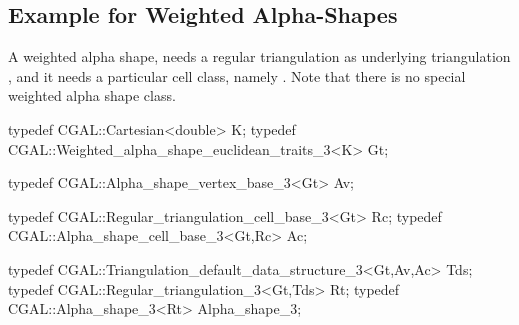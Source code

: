 
\subsection{Example for Weighted Alpha-Shapes\label{I1_SectWeightedAS3D}}

A weighted alpha shape, needs a regular triangulation as
underlying triangulation , and it needs a particular
cell class, namely .
Note that there is no special weighted alpha shape class.

\begin{cprog}
typedef CGAL::Cartesian<double> K;
typedef CGAL::Weighted_alpha_shape_euclidean_traits_3<K> Gt;

typedef CGAL::Alpha_shape_vertex_base_3<Gt> Av;

typedef CGAL::Regular_triangulation_cell_base_3<Gt> Rc;
typedef CGAL::Alpha_shape_cell_base_3<Gt,Rc>  Ac;

typedef CGAL::Triangulation_default_data_structure_3<Gt,Av,Ac> Tds;
typedef CGAL::Regular_triangulation_3<Gt,Tds> Rt;
typedef CGAL::Alpha_shape_3<Rt> Alpha_shape_3;
\end{cprog}
